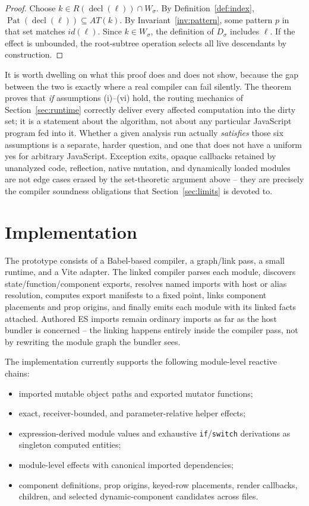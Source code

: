 \documentclass[conference]{IEEEtran}
\begin{document}
\begin{proof}
Choose $k\in R(\operatorname{decl}(\ell))\cap W_\sigma$. By
Definition~\ref{def:index},
$\operatorname{Pat}(\operatorname{decl}(\ell))\subseteq AT(k)$. By
Invariant~\ref{inv:pattern}, some pattern $p$ in that set matches $id(\ell)$.
Since $k\in W_\sigma$, the definition of $D_\sigma$ includes $\ell$. If the
effect is unbounded, the root-subtree operation selects all live descendants by
construction.
\end{proof}

It is worth dwelling on what this proof does and does not show, because the
gap between the two is exactly where a real compiler can fail silently. The
theorem proves that \emph{if} assumptions (i)--(vi) hold, the routing
mechanics of Section~\ref{sec:runtime} correctly deliver every affected
computation into the dirty set; it is a statement about the algorithm, not
about any particular JavaScript program fed into it. Whether a given analysis
run actually \emph{satisfies} those six assumptions is a separate, harder
question, and one that does not have a uniform yes for arbitrary JavaScript.
Exception exits, opaque callbacks retained by unanalyzed code, reflection,
native mutation, and dynamically loaded modules are not edge cases erased by
the set-theoretic argument above -- they are precisely the compiler soundness
obligations that Section~\ref{sec:limits} is devoted to.

\section{Implementation}
\label{sec:implementation}

The prototype consists of a Babel-based compiler, a graph/link pass, a small
runtime, and a Vite adapter. The linked compiler parses each module,
discovers state/function/component exports, resolves named imports with host
or alias resolution, computes export manifests to a fixed point, links
component placements and prop origins, and finally emits each module with its
linked facts attached. Authored ES imports remain ordinary imports as far as
the host bundler is concerned -- the linking happens entirely inside the
compiler pass, not by rewriting the module graph the bundler sees.

The implementation currently supports the following module-level reactive
chains:

\begin{itemize}
  \item imported mutable object paths and exported mutator functions;
  \item exact, receiver-bounded, and parameter-relative helper effects;
  \item expression-derived module values and exhaustive \texttt{if}/\texttt{switch}
  derivations as singleton computed entities;
  \item module-level effects with canonical imported dependencies;
  \item component definitions, prop origins, keyed-row placements, render
  callbacks, children, and selected dynamic-component candidates across files.
\end{itemize}
\end{document}
